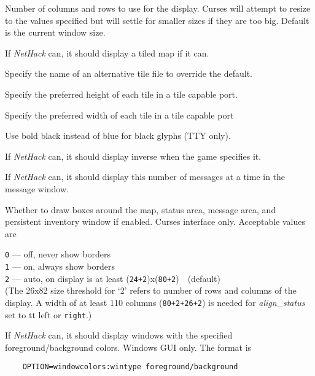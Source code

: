 Number of columns and rows to use for the display.
Curses will attempt to resize to the values specified but will settle
for smaller sizes if they are too big.
Default is the current window size.
\item[\ib{tiled\verb+_+map}]
If {\it NetHack\/} can, it should display a tiled map if it can.
\item[\ib{tile\verb+_+file}]
Specify the name of an alternative tile file to override the default.
\item[\ib{tile\verb+_+height}]
Specify the preferred height of each tile in a tile capable port.
\item[\ib{tile\verb+_+width}]
Specify the preferred width of each tile in a tile capable port
\item[\ib{use\verb+_+darkgray}]
Use bold black instead of blue for black glyphs (TTY only).
\item[\ib{use\verb+_+inverse}]
If {\it NetHack\/} can, it should display inverse when the game specifies it.
\item[\ib{vary\verb+_+msgcount}]
If {\it NetHack\/} can, it should display this number of messages at a time
in the message window.
\item[\ib{windowborders}]
Whether to draw boxes around the map, status area, message area, and
persistent inventory window if enabled.
Curses interface only.
Acceptable values are

{\tt 0} --- off, never show borders\\
{\tt 1} --- on, always show borders\\
{\tt 2} --- auto, on display is at least
(\verb&24+2&)x(\verb&80+2&)\ \ (default)\\

(The 26x82 size threshold for `2' refers to number of rows and
columns of the display.
A width of at least 110 columns (\verb&80+2+26+2&) is needed for
{\it align_status\/}
set to {tt left} or {\tt right}.)
\item[\ib{windowcolors}]
If {\it NetHack\/} can, it should display windows with the specified
foreground/background colors. Windows GUI only. The format is
\begin{verbatim}
    OPTION=windowcolors:wintype foreground/background
\end{verbatim}

